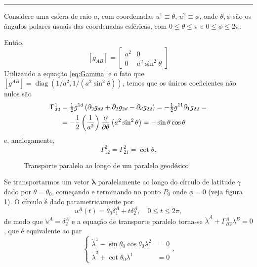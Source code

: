 \noindent
\rule{\textwidth}{0.4pt}
\begin{exemplo}

Considere uma esfera de raio $a$, com coordenadas $u^1\equiv \theta,\, u^2\equiv\phi$, onde $\theta,\phi$ são os ângulos polares usuais das coordenadas esféricas, com $0\leq\theta\leq\pi$ e $0\leq\phi\leq 2\pi$.

Então, 
\[
\left[g_{A B}\right]=\left[\begin{array}{cc}{a^{2}} & {0} \\ {0} & {a^{2} \sin ^{2} \theta}\end{array}\right]
\]
Utilizando a equação \eqref{eq:Gamma} e o fato que $[g^{AB}] = \operatorname{diag}(1/a^2, 1/(a^2\sin^2\theta))$, temos que os únicos coeficientes não nulos são
\begin{align*}
\Gamma_{22}^{1}&= \tfrac{1}{2}g^{1d}\left( \partial_2g_{d2}+\partial_2g_{2d}-\partial_d g_{22} \right) =-\tfrac{1}{2}g^{11}\partial_1g_{22}=\\
&=-\frac{1}{2}\left( \frac{1}{a^2} \right)\pdv{\theta} \left( a^2\sin^2\theta \right) =-\sin \theta \cos \theta
\end{align*}	
e, analogamente,
\[\Gamma_{12}^{2}=\Gamma_{21}^{2}=\cot \theta .\]

\begin{figure}[t]
	\centering
	\caption{Transporte paralelo ao longo de um paralelo geodésico}
	\label{fig:EsferaTransporteParalelo}
\end{figure}


Se transportarmos um vetor $\boldsymbol{\lambda}$ paralelamente ao longo do círculo de latitude $\gamma$ dado por $\theta=\theta_0$, começando e terminando no ponto $P_0$ onde $\phi=0$ (veja figura \ref{fig:EsferaTransporteParalelo}). O círculo é dado parametricamente por
\[u^{A}(t)=\theta_{0} \delta_{1}^{A}+t \delta_{2}^{A}, \quad 0 \leq t \leq 2 \pi,\]
de modo que $\dot{u}^{A}=\delta_{2}^{A}$ e a equação de transporte paralelo torna-se $\dot{\lambda}^{A}+\Gamma_{B 2}^{A} \lambda^{B}=0$, que é equivalente ao par
\begin{equation}\label{eq:EquacoesTransporteLambda}
\left\{\begin{aligned} \dot{\lambda}^{1}-\sin \theta_{0} \cos \theta_{0} \lambda^{2} &=0 \\ \dot{\lambda}^{2}+\cot \theta_{0} \lambda^{1} &=0 \end{aligned}\right. .
\end{equation}


\end{exemplo}

